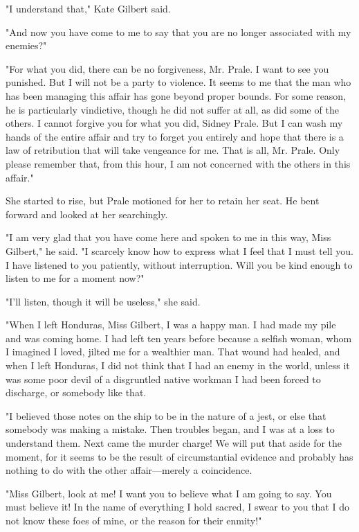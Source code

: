 \documentclass{novel}
\begin{document}
"I understand that," Kate Gilbert said.

"And now you have come to me to say that you are no longer associated with my enemies?"

"For what you did, there can be no forgiveness, Mr. Prale. I want to see you punished. But I will not be a party to violence. It seems to me that the man who has been managing this affair has gone beyond proper bounds. For some reason, he is particularly vindictive, though he did not suffer at all, as did some of the others. I cannot forgive you for what you did, Sidney Prale. But I can wash my hands of the entire affair and try to forget you entirely and hope that there is a law of retribution that will take vengeance for me. That is all, Mr. Prale. Only please remember that, from this hour, I am not concerned with the others in this affair."

She started to rise, but Prale motioned for her to retain her seat. He bent forward and looked at her searchingly.

"I am very glad that you have come here and spoken to me in this way, Miss Gilbert," he said. "I scarcely know how to express what I feel that I must tell you. I have listened to you patiently, without interruption. Will you be kind enough to listen to me for a moment now?"

"I'll listen, though it will be useless," she said.

"When I left Honduras, Miss Gilbert, I was a happy man. I had made my pile and was coming home. I had left ten years before because a selfish woman, whom I imagined I loved, jilted me for a wealthier man. That wound had healed, and when I left Honduras, I did not think that I had an enemy in the world, unless it was some poor devil of a disgruntled native workman I had been forced to discharge, or somebody like that.

"I believed those notes on the ship to be in the nature of a jest, or else that somebody was making a mistake. Then troubles began, and I was at a loss to understand them. Next came the murder charge! We will put that aside for the moment, for it seems to be the result of circumstantial evidence and probably has nothing to do with the other affair---merely a coincidence.

"Miss Gilbert, look at me! I want you to believe what I am going to say. You must believe it! In the name of everything I hold sacred, I swear to you that I do not know these foes of mine, or the reason for their enmity!"
\end{document}
